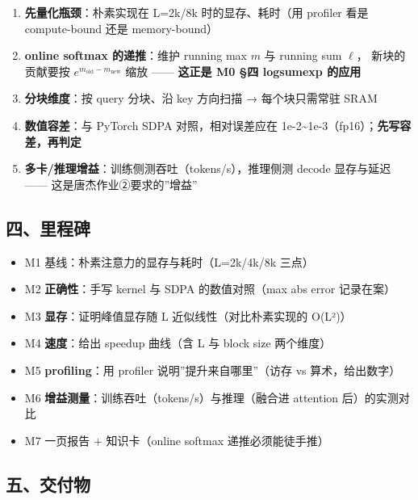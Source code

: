 \documentclass[
  chinese,
  11pt,
]{ctexart}
\providecommand{\tightlist}{%
  \setlength{\itemsep}{0pt}\setlength{\parskip}{0pt}}
\begin{document}
\begin{enumerate}
\def\labelenumi{\arabic{enumi}.}
\tightlist
\item
  \textbf{先量化瓶颈}：朴素实现在 L=2k/8k 时的显存、耗时（用 profiler 看是 compute-bound 还是 memory-bound）
\item
  \textbf{online softmax 的递推}：维护 running max \(m\) 与 running sum \(\ell\)， 新块的贡献要按 \(e^{m_{\text{old}}-m_{\text{new}}}\) 缩放 ------ \textbf{这正是 M0 §四 logsumexp 的应用}
\item
  \textbf{分块维度}：按 query 分块、沿 key 方向扫描 → 每个块只需常驻 SRAM
\item
  \textbf{数值容差}：与 PyTorch SDPA 对照，相对误差应在 1e-2\textasciitilde1e-3（fp16）；\textbf{先写容差，再判定}
\item
  \textbf{多卡/推理增益}：训练侧测吞吐（tokens/s），推理侧测 decode 显存与延迟 ------ 这是唐杰作业②要求的''增益''
\end{enumerate}

\subsection{四、里程碑}\label{ux56dbux91ccux7a0bux7891-3}

\begin{itemize}
\tightlist
\item[$\square$]
  M1 基线：朴素注意力的显存与耗时（L=2k/4k/8k 三点）
\item[$\square$]
  M2 \textbf{正确性}：手写 kernel 与 SDPA 的数值对照（max abs error 记录在案）
\item[$\square$]
  M3 \textbf{显存}：证明峰值显存随 L 近似线性（对比朴素实现的 O(L²)）
\item[$\square$]
  M4 \textbf{速度}：给出 speedup 曲线（含 L 与 block size 两个维度）
\item[$\square$]
  M5 \textbf{profiling}：用 profiler 说明''提升来自哪里''（访存 vs 算术，给出数字）
\item[$\square$]
  M6 \textbf{增益测量}：训练吞吐（tokens/s）与推理（融合进 attention 后）的实测对比
\item[$\square$]
  M7 一页报告 + 知识卡（online softmax 递推必须能徒手推）
\end{itemize}

\subsection{五、交付物}\label{ux4e94ux4ea4ux4ed8ux7269-3}
\end{document}
